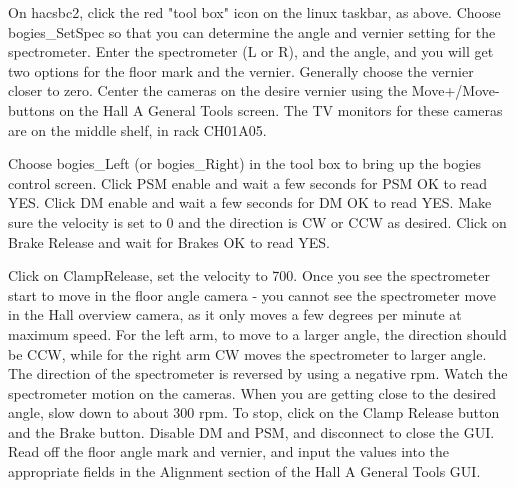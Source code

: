 {On hacsbc2, click the red "tool box" icon on the linux taskbar, as above. Choose 
bogies\_SetSpec so that you can determine the angle and vernier setting for the spectrometer.
Enter the spectrometer (L or R), and the angle, and you will get two options for the floor 
mark and the vernier. Generally choose the vernier closer to zero. Center the cameras on the 
desire vernier using the Move+/Move- buttons on the Hall A General Tools screen. The TV monitors 
for these cameras are on the middle shelf, in rack CH01A05.

Choose bogies\_Left (or bogies\_Right) in the tool box to bring up the bogies control screen. 
Click PSM enable and wait a few seconds for PSM OK to read YES. 
Click DM enable and wait a few seconds for DM OK to read YES.
Make sure the velocity is set to 0 and the direction is CW or CCW as desired. Click on Brake Release 
and wait for Brakes OK to read YES.

Click on ClampRelease, set the velocity to 700. Once you see the spectrometer start to move in the 
floor angle camera - you cannot see the spectrometer move in the Hall overview camera, as it only 
moves a few degrees per minute at maximum speed. For the left arm, to move to a larger angle, the 
direction should be CCW, while for the right arm CW moves the spectrometer to larger angle. The 
direction of the spectrometer is reversed by using a negative rpm. Watch the spectrometer motion 
on the cameras. When you are getting close to the desired angle, slow down to about 300 rpm. 
To stop, click on the Clamp Release button and the Brake button. Disable DM and PSM, and disconnect 
to close the GUI. Read off the floor angle mark and vernier, and input the values into the appropriate 
fields in the Alignment section of the Hall A General Tools GUI. 
}

